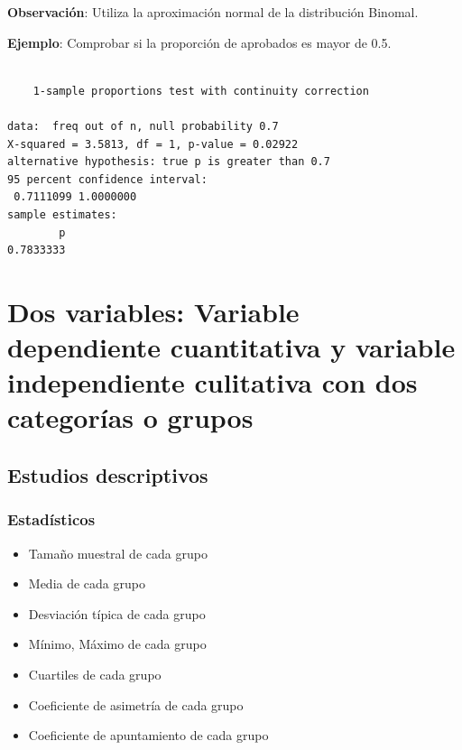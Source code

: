 \documentclass[
  a4paper,
]{scrreport}
\newenvironment{Shaded}{\begin{snugshade}}{\end{snugshade}}
\newcommand{\AttributeTok}[1]{\textcolor[rgb]{0.40,0.45,0.13}{#1}}
\newcommand{\FloatTok}[1]{\textcolor[rgb]{0.68,0.00,0.00}{#1}}
\newcommand{\FunctionTok}[1]{\textcolor[rgb]{0.28,0.35,0.67}{#1}}
\newcommand{\NormalTok}[1]{\textcolor[rgb]{0.00,0.23,0.31}{#1}}
\newcommand{\OtherTok}[1]{\textcolor[rgb]{0.00,0.23,0.31}{#1}}
\newcommand{\SpecialCharTok}[1]{\textcolor[rgb]{0.37,0.37,0.37}{#1}}
\newcommand{\StringTok}[1]{\textcolor[rgb]{0.13,0.47,0.30}{#1}}
\providecommand{\tightlist}{%
  \setlength{\itemsep}{0pt}\setlength{\parskip}{0pt}}\usepackage{longtable,booktabs,array}
\theoremstyle{definition}
\theoremstyle{definition}
\theoremstyle{remark}
\begin{document}
\textbf{Observación}: Utiliza la aproximación normal de la distribución
Binomal.

\textbf{Ejemplo}: Comprobar si la proporción de aprobados es mayor de
0.5.

\begin{Shaded}
\end{Shaded}

\begin{verbatim}

    1-sample proportions test with continuity correction

data:  freq out of n, null probability 0.7
X-squared = 3.5813, df = 1, p-value = 0.02922
alternative hypothesis: true p is greater than 0.7
95 percent confidence interval:
 0.7111099 1.0000000
sample estimates:
        p 
0.7833333 
\end{verbatim}

\hypertarget{dos-variables-variable-dependiente-cuantitativa-y-variable-independiente-culitativa-con-dos-categoruxedas-o-grupos}{%
\section{Dos variables: Variable dependiente cuantitativa y variable
independiente culitativa con dos categorías o
grupos}\label{dos-variables-variable-dependiente-cuantitativa-y-variable-independiente-culitativa-con-dos-categoruxedas-o-grupos}}

\hypertarget{estudios-descriptivos-2}{%
\subsection{Estudios descriptivos}\label{estudios-descriptivos-2}}

\hypertarget{estaduxedsticos-2}{%
\subsubsection{Estadísticos}\label{estaduxedsticos-2}}

\begin{itemize}
\tightlist
\item
  Tamaño muestral de cada grupo
\item
  Media de cada grupo
\item
  Desviación típica de cada grupo
\item
  Mínimo, Máximo de cada grupo
\item
  Cuartiles de cada grupo
\item
  Coeficiente de asimetría de cada grupo
\item
  Coeficiente de apuntamiento de cada grupo
\end{itemize}
\end{document}
